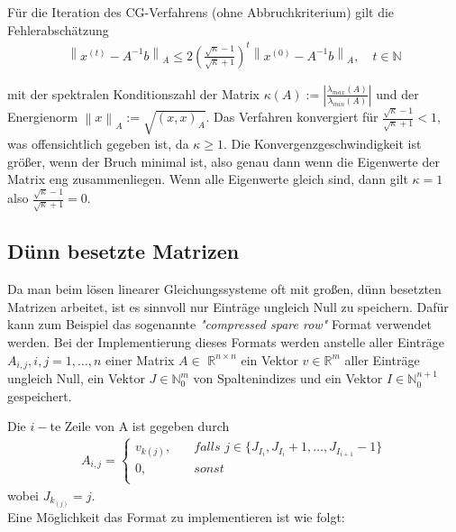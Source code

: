 \documentclass[12pt,a4paper]{scrartcl}
\numberwithin{equation}{section}
\numberwithin{myalgctr}{section}
\numberwithin{mytheoremctr}{subsection}
\numberwithin{mykorollarctr}{subsection}
\numberwithin{mylemmactr}{subsection}
\numberwithin{mybeispielctr}{subsection}
\newcommand\norm[1]{\left\lVert#1\right\rVert}
\begin{document}
	
	
	
	Für die Iteration des CG-Verfahrens (ohne Abbruchkriterium) gilt die Fehlerabschätzung \autocite[vgl.][102]{skript}
	\begin{align*}
		\norm{x^{(t)} - A^{-1}b}_A \leq 2\left(\frac{\sqrt{\kappa} - 1}{\sqrt{\kappa} + 1}\right)^{t}\norm{x^{(0)} - A^{-1}b}_A, \quad t\in\mathbb{N}
	\end{align*}
	
	mit der spektralen Konditionszahl der Matrix $\kappa(A) := \left|\frac{\lambda_{max}(A)}{\lambda_{min}(A)}\right|$ und der Energienorm $\norm{x}_A := \sqrt{(x,x)_A}$. Das Verfahren konvergiert für $\frac{\sqrt{\kappa} - 1}{\sqrt{\kappa} + 1} < 1$, was offensichtlich gegeben ist, da $\kappa \geq 1$. Die Konvergenzgeschwindigkeit ist größer, wenn der Bruch minimal ist, also genau dann wenn die Eigenwerte der Matrix eng zusammenliegen. Wenn alle Eigenwerte gleich sind, dann gilt $\kappa = 1$ also $\frac{\sqrt{\kappa} - 1}{\sqrt{\kappa} + 1} = 0$. 
	
	\subsection{Dünn besetzte Matrizen}
	
	Da man beim lösen linearer Gleichungssysteme oft mit großen, dünn besetzten Matrizen arbeitet, ist es sinnvoll nur Einträge ungleich Null zu speichern. Dafür kann zum Beispiel das sogenannte \textit{"compressed spare row"} Format verwendet werden. Bei der Implementierung dieses Formats werden anstelle aller Einträge $A_{i,j}, i,j = 1,\ldots,n$ einer Matrix $A\in$ $\mathbb{R}^{n\times n}$ ein Vektor $v\in\mathbb{R}^{m}$ aller Einträge ungleich Null, ein Vektor $J\in\mathbb{N}_0^{m}$ von Spaltenindizes und ein Vektor $I\in\mathbb{N}_0^{n+1}$ gespeichert.
	
	Die $i-$te Zeile von A ist gegeben durch
	\begin{align*}
		A_{i,j} = 
		\begin{cases}
			\textit{$v_{k(j)}$},&\quad\textit{falls $j \in \{J_{I_i}, J_{I_{i}} + 1, \ldots, J_{I_{i+1}} - 1$}\}\\
			\textit{0},&\quad\textit{sonst}\\
		\end{cases}
	\end{align*} 
	wobei $J_{k_{(j)}} = j$.\\
	
	Eine Möglichkeit das Format zu implementieren ist wie folgt:
	
\end{document}
